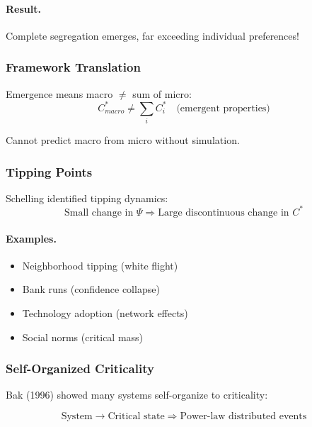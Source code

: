 \paragraph{Result.}
Complete segregation emerges, far exceeding individual preferences!

\subsubsection{Framework Translation}

Emergence means macro $\neq$ sum of micro:
\begin{equation}
\boxed{
C^*_{macro} \neq \sum_i C^*_i \quad \text{(emergent properties)}
}
\label{eq:emergence}
\end{equation}

Cannot predict macro from micro without simulation.

\subsubsection{Tipping Points}

Schelling identified tipping dynamics:
\begin{equation}
\text{Small change in } \Psi \Rightarrow \text{Large discontinuous change in } C^*
\end{equation}

\paragraph{Examples.}
\begin{itemize}
    \item Neighborhood tipping (white flight)
    \item Bank runs (confidence collapse)
    \item Technology adoption (network effects)
    \item Social norms (critical mass)
\end{itemize}

\subsubsection{Self-Organized Criticality}

Bak (1996) showed many systems self-organize to criticality:

\begin{equation}
\boxed{
\text{System} \to \text{Critical state} \Rightarrow \text{Power-law distributed events}
}
\label{eq:soc}
\end{equation}

